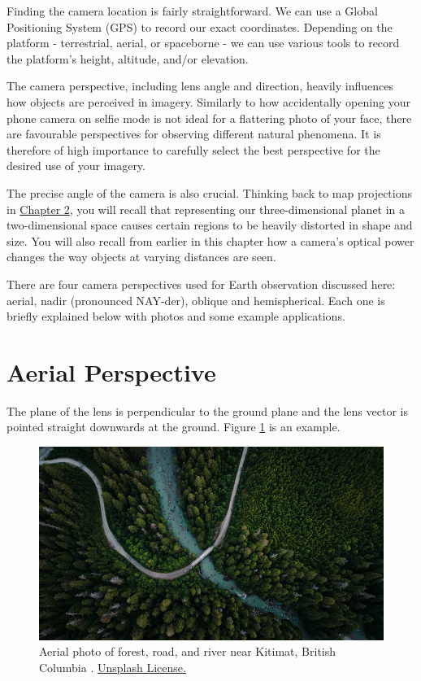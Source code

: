 \documentclass[
]{book}
\begin{document}
Finding the camera location is fairly straightforward. We can use a Global Positioning System (GPS) to record our exact coordinates. Depending on the platform - terrestrial, aerial, or spaceborne - we can use various tools to record the platform's height, altitude, and/or elevation.

The camera perspective, including lens angle and direction, heavily influences how objects are perceived in imagery. Similarly to how accidentally opening your phone camera on selfie mode is not ideal for a flattering photo of your face, there are favourable perspectives for observing different natural phenomena. It is therefore of high importance to carefully select the best perspective for the desired use of your imagery.

The precise angle of the camera is also crucial. Thinking back to map projections in \href{https://ubc-geomatics-textbook.github.io/geomatics-textbook/mapping-data.html}{Chapter 2}, you will recall that representing our three-dimensional planet in a two-dimensional space causes certain regions to be heavily distorted in shape and size. You will also recall from earlier in this chapter how a camera's optical power changes the way objects at varying distances are seen.

There are four camera perspectives used for Earth observation discussed here: aerial, nadir (pronounced NAY-der), oblique and hemispherical. Each one is briefly explained below with photos and some example applications.

\section{Aerial Perspective}\label{aerial-perspective}

The plane of the lens is perpendicular to the ground plane and the lens vector is pointed straight downwards at the ground. Figure \ref{fig:12-aerial-plane} is an example.



\begin{figure}
\includegraphics[width=0.75\linewidth]{images/12-aerial-plane} \caption{Aerial photo of forest, road, and river near Kitimat, British Columbia \citep{den_engelsen_photo_2020}. \href{https://unsplash.com/license}{Unsplash License.}}\label{fig:12-aerial-plane}
\end{figure}
\end{document}
